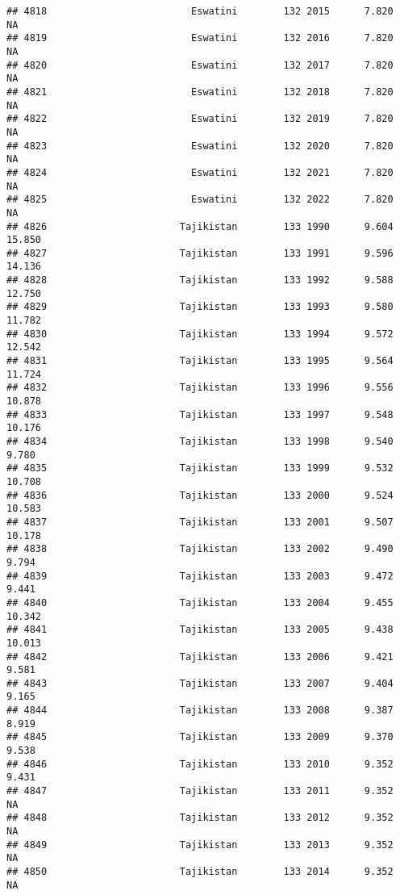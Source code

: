 \documentclass[
]{article}
\begin{document}
\begin{verbatim}
## 4818                         Eswatini        132 2015      7.820         NA
## 4819                         Eswatini        132 2016      7.820         NA
## 4820                         Eswatini        132 2017      7.820         NA
## 4821                         Eswatini        132 2018      7.820         NA
## 4822                         Eswatini        132 2019      7.820         NA
## 4823                         Eswatini        132 2020      7.820         NA
## 4824                         Eswatini        132 2021      7.820         NA
## 4825                         Eswatini        132 2022      7.820         NA
## 4826                       Tajikistan        133 1990      9.604     15.850
## 4827                       Tajikistan        133 1991      9.596     14.136
## 4828                       Tajikistan        133 1992      9.588     12.750
## 4829                       Tajikistan        133 1993      9.580     11.782
## 4830                       Tajikistan        133 1994      9.572     12.542
## 4831                       Tajikistan        133 1995      9.564     11.724
## 4832                       Tajikistan        133 1996      9.556     10.878
## 4833                       Tajikistan        133 1997      9.548     10.176
## 4834                       Tajikistan        133 1998      9.540      9.780
## 4835                       Tajikistan        133 1999      9.532     10.708
## 4836                       Tajikistan        133 2000      9.524     10.583
## 4837                       Tajikistan        133 2001      9.507     10.178
## 4838                       Tajikistan        133 2002      9.490      9.794
## 4839                       Tajikistan        133 2003      9.472      9.441
## 4840                       Tajikistan        133 2004      9.455     10.342
## 4841                       Tajikistan        133 2005      9.438     10.013
## 4842                       Tajikistan        133 2006      9.421      9.581
## 4843                       Tajikistan        133 2007      9.404      9.165
## 4844                       Tajikistan        133 2008      9.387      8.919
## 4845                       Tajikistan        133 2009      9.370      9.538
## 4846                       Tajikistan        133 2010      9.352      9.431
## 4847                       Tajikistan        133 2011      9.352         NA
## 4848                       Tajikistan        133 2012      9.352         NA
## 4849                       Tajikistan        133 2013      9.352         NA
## 4850                       Tajikistan        133 2014      9.352         NA

\end{verbatim}
\end{document}
